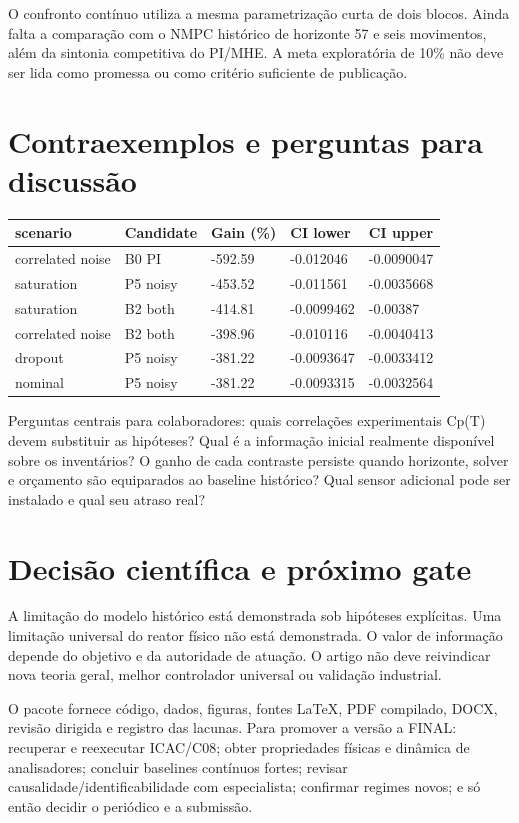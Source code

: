 \documentclass[
  11pt,
]{article}
\begin{document}
O confronto contínuo utiliza a mesma parametrização curta de dois
blocos. Ainda falta a comparação com o NMPC histórico de horizonte 57 e
seis movimentos, além da sintonia competitiva do PI/MHE. A meta
exploratória de 10\% não deve ser lida como promessa ou como critério
suficiente de publicação.

\newpage

\hypertarget{contraexemplos-e-perguntas-para-discussuxe3o}{%
\section{Contraexemplos e perguntas para
discussão}\label{contraexemplos-e-perguntas-para-discussuxe3o}}

\begingroup\footnotesize

\begin{longtable}[]{@{}lllll@{}}
\toprule\noalign{}
scenario & Candidate & Gain (\%) & CI lower & CI upper \\
\midrule\noalign{}
\endhead
\bottomrule\noalign{}
\endlastfoot
correlated noise & B0 PI & -592.59 & -0.012046 & -0.0090047 \\
saturation & P5 noisy & -453.52 & -0.011561 & -0.0035668 \\
saturation & B2 both & -414.81 & -0.0099462 & -0.00387 \\
correlated noise & B2 both & -398.96 & -0.010116 & -0.0040413 \\
dropout & P5 noisy & -381.22 & -0.0093647 & -0.0033412 \\
nominal & P5 noisy & -381.22 & -0.0093315 & -0.0032564 \\
\end{longtable}

\endgroup

Perguntas centrais para colaboradores: quais correlações experimentais
Cp(T) devem substituir as hipóteses? Qual é a informação inicial
realmente disponível sobre os inventários? O ganho de cada contraste
persiste quando horizonte, solver e orçamento são equiparados ao
baseline histórico? Qual sensor adicional pode ser instalado e qual seu
atraso real?

\newpage

\hypertarget{decisuxe3o-cientuxedfica-e-pruxf3ximo-gate}{%
\section{Decisão científica e próximo
gate}\label{decisuxe3o-cientuxedfica-e-pruxf3ximo-gate}}

A limitação do modelo histórico está demonstrada sob hipóteses
explícitas. Uma limitação universal do reator físico não está
demonstrada. O valor de informação depende do objetivo e da autoridade
de atuação. O artigo não deve reivindicar nova teoria geral, melhor
controlador universal ou validação industrial.

O pacote fornece código, dados, figuras, fontes LaTeX, PDF compilado,
DOCX, revisão dirigida e registro das lacunas. Para promover a versão a
FINAL: recuperar e reexecutar ICAC/C08; obter propriedades físicas e
dinâmica de analisadores; concluir baselines contínuos fortes; revisar
causalidade/identificabilidade com especialista; confirmar regimes
novos; e só então decidir o periódico e a submissão.
\end{document}
